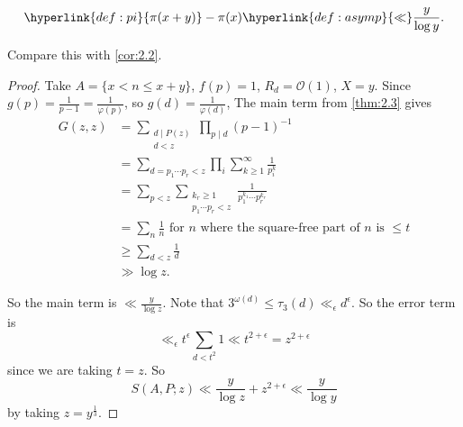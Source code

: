 \documentclass{article}
\newcommand{\bigO}{\mathcal{O}}
\begin{document}
\begin{ncor}\label{cor:2.4}
  \begin{equation*}
    \hyperlink{def:pi}{\pi(x+y)} - \pi(x) \hyperlink{def:asymp}{\ll} \frac{y}{\log y}.
  \end{equation*}
\end{ncor}
Compare this with \cref{cor:2.2}.
\begin{proof}
  Take $A = \{x < n \leq x+y\}$, $f(p) = 1$, $R_d = \bigO(1)$, $X = y$.
  Since $g(p) = \frac{1}{p-1} = \frac{1}{\varphi(p)}$, so $g(d) = \frac{1}{\varphi(d)}$,
  The main term from \cref{thm:2.3} gives
  \begin{align*}
    G(z,z) &= \sum_{\substack{d \mid P(z) \\ d < z}} \prod_{p \mid d} (p-1)^{-1} \\
           &= \sum_{d = p_1 \dotsm p_r < z} \prod_i \sum_{k \geq 1}^\infty \frac{1}{p_i^k} \\
           &= \sum_{p < z} \sum_{\substack{k_r \geq 1 \\ p_1 \dotsm p_r < z}} \frac{1}{p_1^{k_1} \dotsm p_r^{k_r}} \\
           &= \sum_{n} \frac{1}{n} \text{ for $n$ where the square-free part of $n$ is $\leq t$}\\
           &\geq \sum_{d<z} \frac{1}{d} \\
           &\gg \log z.
  \end{align*}

  So the main term is $\ll \frac{y}{\log z}$.
  Note that $3^{\omega(d)} \leq \tau_3(d) \ll_\epsilon d^\epsilon$. So the error term is
  \begin{equation*}
    \ll_\epsilon t^\epsilon \sum_{d < t^2} 1 \ll t^{2 + \epsilon} = z^{2+\epsilon}
  \end{equation*}
  since we are taking $t = z$.
  So
  \begin{equation*}
    S(A,P;z) \ll \frac{y}{\log z} + z^{2+\epsilon} \ll \frac{y}{\log y}
  \end{equation*}
  by taking $z = y^{\frac{1}{3}}$.
\end{proof}
\end{document}
